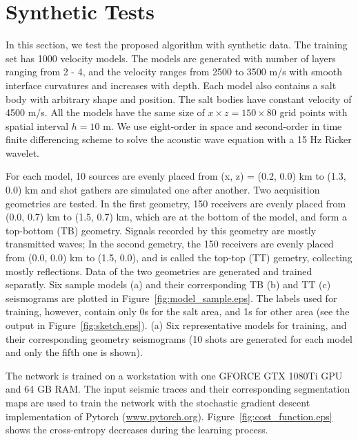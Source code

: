 \documentclass{segabs}
\begin{document}
\section{Synthetic Tests}
In this section, we test the proposed algorithm with synthetic data. 
The training set has 1000 velocity models. The models are generated with number of layers ranging from 2 - 4, and the velocity ranges from 2500 to 3500 m/s with smooth interface curvatures and increases with depth. Each model also contains a salt body with arbitrary shape and position. The salt bodies have constant velocity of 4500 m/s. All the models have the same size of $x\times z = 150 \times 80$ grid points with spatial interval $h=10$ m. 
We use eight-order in space and second-order in time finite differencing scheme to solve the acoustic wave equation with a 15 Hz Ricker wavelet.

For each model, 10 sources are evenly placed from (x, z) = (0.2, 0.0) km to (1.3, 0.0) km and shot gathers are simulated one after another. 
Two acquisition geometries are tested. In the first geometry, 150 receivers are evenly placed from (0.0, 0.7) km to (1.5, 0.7) km, which are at the bottom of the model, and form a top-bottom (TB) geometry. Signals recorded by this geometry are mostly transmitted waves;
In the second gemetry, the 150 receivers are evenly placed from (0.0, 0.0) km to (1.5, 0.0), and is called the top-top (TT) gemetry, collecting mostly reflections. Data of the two geometries are generated and trained separatly.  
Six sample models (a) and their corresponding TB (b) and TT (c) seismograms are plotted in Figure~\ref{fig:model_sample.eps}. The labels used for training, however, contain only 0s for the salt area, and 1s for other area (see the output in Figure~\ref{fig:sketch.eps}). 
{(a) Six representative models for training, and their corresponding geometry seismograms (10 shots are generated for each model and only the fifth one is shown).}

The network is trained on a workstation with one GFORCE GTX 1080Ti GPU and 64 GB RAM. The input seismic traces and their corresponding segmentation maps are used to train the network with the stochastic gradient descent implementation of Pytorch (\url{www.pytorch.org}). Figure~\ref{fig:cost_function.eps} shows the cross-entropy decreases during the learning process.
\end{document}

